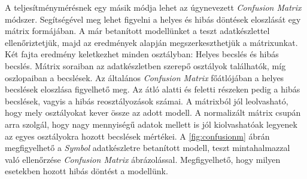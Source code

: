 A teljesítménymérésnek egy másik módja lehet az úgynevezett \textit{Confusion Matrix} módszer. Segítségével meg lehet figyelni a helyes és hibás döntések eloszlását egy mátrix formájában.\cite{koesmarno2019class}
A már betanított modellünket a teszt adatkészlettel ellenőriztetjük, majd az eredmények alapján megszerkeszthetjük a mátrixunkat. Két fajta eredmény keletkezhet minden osztályban: Helyes becslés és hibás becslés. Mátrix soraiban az adatkészletben szerepő osztályok találhatók, míg oszlopaiban a becslések. Az általános \textit{Confusion Matrix} főátlójában a helyes becslések eloszlása figyelhető meg. Az átló alatti és feletti részeken pedig a hibás becslések, vagyis a hibás reosztályozások számai. A mátrixból jól leolvasható, hogy mely osztályokat kever össze az adott modell. A normalizált mátrix csupán arra szolgál, hogy nagy mennyiségű adatok mellett is jól kiolvashatóak legyenek az egyes osztályokra hozott becslések mértékei.
A \ref{fig:confusionm} ábrán megfigyelhető a \textit{Symbol} adatkészletre betanított modell, teszt mintahalmazzal való ellenőrzése \textit{Confusion Matrix} ábrázolással. Megfigyelhető, hogy milyen esetekben hozott hibás döntést a modellünk.



